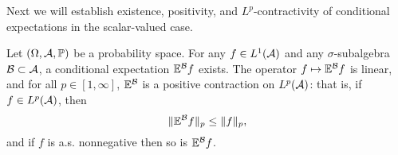 Next we will establish existence, positivity, and $L^p$-contractivity of conditional expectations in the scalar-valued case.

\begin{thm}\label{thm:conditional-expectation-existence-scalar}
  Let $(\Omega,\mathcal{A},\mathbb{P})$ be a probability space.
  For any $f \in L^1(\mathcal{A})$ and any $\sigma$-subalgebra $\mathcal{B} \subset \mathcal{A}$, a conditional expectation $\mathbb{E}^{\mathcal{B}}f$ exists.
  The operator $f \mapsto \mathbb{E}^{\mathcal{B}}f$ is linear, and for all $p \in [1,\infty]$, $\mathbb{E}^{\mathcal{B}}$ is a positive contraction on $L^p(\mathcal{A})$: that is, if $f \in L^p(\mathcal{A})$, then
  \begin{equation*}
    \|\mathbb{E}^{\mathcal{B}}f\|_{p} \leq \|f\|_{p},
  \end{equation*}
  and if $f$ is a.s. nonnegative then so is $\mathbb{E}^{\mathcal{B}}f$.
\end{thm}

